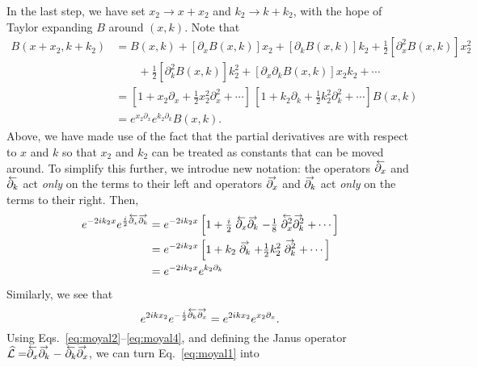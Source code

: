 %
In the last step, we have set $x_{2} \to x + x_{2}$ and $k_{2} \to k + k_{2}$, with the hope of Taylor expanding $B$ around $(x, k)$.
Note that
%
\begin{equation}
  \begin{aligned}
    B(x + x_{2}, k + k_{2}) &= B(x, k) + [\partial_{x} B(x, k)]x_{2} + [\partial_{k} B(x, k)] k_{2} + \tfrac{1}{2} [\partial^{2}_{x} B(x, k)] x_{2}^{2}\\
    &\qquad + \tfrac{1}{2} [\partial^{2}_{k} B(x, k)] k_{2}^{2} + [\partial_{x}\partial_{k} B(x, k)] x_{2}k_{2} + \cdots \\
    &= \left[1 + x_{2}\partial_{x} + \tfrac{1}{2}x_{2}^{2}\partial^{2}_{x} + \cdots \right]\,
  \left[1 + k_{2}\partial_{k} + \tfrac{1}{2}k_{2}^{2}\partial^{2}_{k} + \cdots \right] B(x, k)\\
    &= e^{x_{2}\partial_{x}} e^{k_{2}\partial_{k}} B(x, k).\label{eq:moyal2}
  \end{aligned}
\end{equation}
%
Above, we have made use of the fact that the partial derivatives are with respect to $x$ and $k$ so that $x_{2}$ and $k_{2}$ can be treated as constants that can be moved around.
To simplify this further, we introdue new notation: the operators $\ogets{\partial_{x}}$ and $\ogets{\partial_{k}}$ act \emph{only} on the terms to their left and operators $\oto{\partial_{x}}$ and $\oto{\partial_{k}}$ act \emph{only} on the terms to their right.
Then,
%
\begin{equation}
  \begin{aligned}
    e^{-2ik_{2}x} e^{\frac{i}{2}\ogets{\partial_{x}}\oto{\partial_{k}}} &= e^{-2ik_{2}x} \left[1 +  \tfrac{i}{2}\ogets{\partial_{x}}\oto{\partial_{k}} - \tfrac{1}{8}\ogets{\partial^{2}_{x}}\oto{\partial^{2}_{k}} + \cdots \right]\\
                                                            &= e^{-2ik_{2}x} \left[1 +  k_{2}\oto{\partial_{k}} + \tfrac{1}{2}k_{2}^{2}\oto{\partial^{2}_{k}} + \cdots \right]\\
                                                            &= e^{-2ik_{2}x}e^{k_{2}\partial_{k}}
  \end{aligned}\label{eq:moyal3}
\end{equation}
%
Similarly, we see that
%
\begin{equation}
  e^{2ikx_{2}}e^{-\frac{i}{2}\ogets{\partial_{k}}\oto{\partial_{x}}} = e^{2ikx_{2}}e^{x_{2}\partial_{x}}.\label{eq:moyal4}
\end{equation}
%
Using Eqs.~\eqref{eq:moyal2}--\eqref{eq:moyal4}, and defining the Janus operator $\widehat{\mathcal{L}} = \ogets{\partial_{x}} \oto{\partial_{k}} - \ogets{\partial_{k}}\oto{\partial_{x}}$, we can turn Eq.~\eqref{eq:moyal1} into
